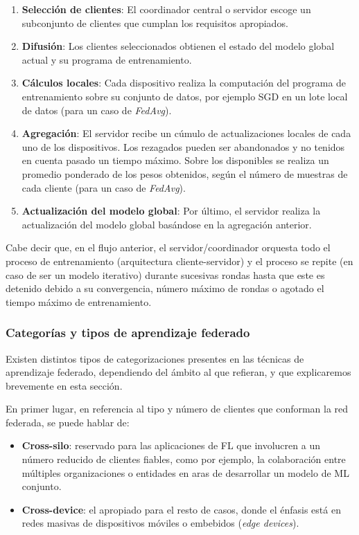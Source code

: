\documentclass[00-Trabajo_Final.tex]{subfiles}
\begin{document}
\begin{enumerate}[noitemsep]
    \item \textbf{Selección de clientes}: El coordinador central o servidor escoge un subconjunto de clientes que cumplan los requisitos apropiados.
    \item \textbf{Difusión}: Los clientes seleccionados obtienen el estado del modelo global actual y su programa de entrenamiento.
    \item \textbf{Cálculos locales}: Cada dispositivo realiza la computación del programa de entrenamiento sobre su conjunto de datos, por ejemplo SGD en un lote local de datos (para un caso de \textit{FedAvg}).
    \item \textbf{Agregación}: El servidor recibe un cúmulo de actualizaciones locales de cada uno de los dispositivos. Los rezagados pueden ser abandonados y no tenidos en cuenta pasado un tiempo máximo. Sobre los disponibles se realiza un promedio ponderado de los pesos obtenidos, según el número de muestras de cada cliente (para un caso de \textit{FedAvg}).
    \item \textbf{Actualización del modelo global}: Por último, el servidor realiza la actualización del modelo global basándose en la agregación anterior.
\end{enumerate}

Cabe decir que, en el flujo anterior, el servidor/coordinador orquesta todo el proceso de entrenamiento (arquitectura cliente-servidor) y el proceso se repite (en caso de ser un modelo iterativo) durante sucesivas rondas hasta que este es detenido debido a su convergencia, número máximo de rondas o agotado el tiempo máximo de entrenamiento.

\subsubsection{Categorías y tipos de aprendizaje federado}
Existen distintos tipos de categorizaciones presentes en las técnicas de aprendizaje federado, dependiendo del ámbito al que refieran, y que explicaremos brevemente en esta sección.

\vspace{0.5em}

En primer lugar, en referencia al tipo y número de clientes que conforman la red federada, se puede hablar de:

\begin{itemize}[noitemsep]
    \item \textbf{Cross-silo}: reservado para las aplicaciones de FL que involucren a un número reducido de clientes fiables, como por ejemplo, la colaboración entre múltiples organizaciones o entidades en aras de desarrollar un modelo de ML conjunto.
    \item \textbf{Cross-device}: el apropiado para el resto de casos, donde el énfasis está en redes masivas de dispositivos móviles o embebidos (\textit{edge devices}).
\end{itemize}
\end{document}
